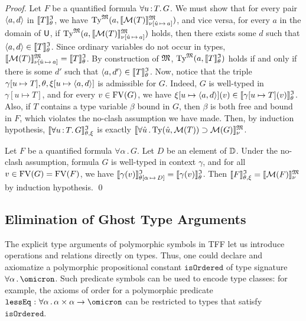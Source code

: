 \begin{proof}
Let $F$ be a quantified formula $\forall u \operatorname{:} T .\, G$.
We must show that for every pair $\langle a,d \rangle$ in $\llbracket T\rrbracket^{\mathfrak{I}}_{\theta}$, we have
$\mathrm{Ty}^{\mathfrak{M}}(a, \llbracket \mathcal{M}(T) \rrbracket^{\mathfrak{M}}_{\nu[\hat{u}\,\mapsto\,a]})$,
and vice versa, for every $a$ in the domain of $\mathsf{U}$, if
$\mathrm{Ty}^{\mathfrak{M}}(a, \llbracket \mathcal{M}(T) \rrbracket^{\mathfrak{M}}_{\nu[\hat{u}\,\mapsto\,a]})$
holds, then there exists some $d$ such that $\langle a,d \rangle \in
\llbracket T\rrbracket^{\mathfrak{I}}_{\theta}$.
%
Since ordinary variables do not occur in types,
$\llbracket \mathcal{M}(T) \rrbracket^{\mathfrak{M}}_{\nu[\hat{u}\,\mapsto\,a]} =
\llbracket T \rrbracket^{\mathfrak{I}}_\theta$.
By construction of $\mathfrak{M}$,
$\mathrm{Ty}^{\mathfrak{M}}(a, \llbracket T \rrbracket^{\mathfrak{I}}_\theta)$
holds if and only if there is some $d'$ such that
$\langle a,d' \rangle \in \llbracket T \rrbracket^{\mathfrak{I}}_\theta$.
%
Now, notice that the triple $\gamma[u \mapsto T],
\theta,\xi[u \mapsto \langle a,d \rangle]$ is admissible for $G$.
Indeed, $G$ is well-typed in $\gamma[u \mapsto T]$,
and for every $v \in \mathrm{FV}(G)$, we have
$\xi[u \mapsto \langle a,d \rangle](v) \in \llbracket\gamma[u \mapsto T](v)\rrbracket^{\mathfrak{I}}_{\theta}$.
Also, if $T$ contains a type variable $\beta$ bound in $G$,
then $\beta$ is both free and bound in $F$, which violates
the no-clash assumption we have made.
%
Then, by induction hypothesis, $\llbracket\forall u \operatorname{:} T .\, G\rrbracket^{\mathfrak{I}}_{\theta,\xi}$
is exactly $\llbracket \forall \hat{u} \,.\, \mathrm{Ty}(\hat{u},\mathcal{M}(T))
\supset \mathcal{M}(G) \rrbracket^{\mathfrak{M}}_{\nu}$.

Let $F$ be a quantified formula $\forall \alpha \,.\, G$.
Let $D$ be an element of $\mathbb{D}$. Under the no-clash assumption,
formula $G$ is well-typed in context $\gamma$, and for all
$v \in \mathrm{FV}(G) = \mathrm{FV}(F)$, we have
$\llbracket\gamma(v)\rrbracket^{\mathfrak{I}}_{\theta[\alpha\,\mapsto\,D]} = \llbracket\gamma(v)\rrbracket^{\mathfrak{I}}_{\theta}$.
Then $\llbracket F\rrbracket^{\mathfrak{I}}_{\theta,\xi} = \llbracket \mathcal{M}(F) \rrbracket^{\mathfrak{M}}_{\nu}$ by induction hypothesis.
\qed
\end{proof}

\subsection{Elimination of Ghost Type Arguments} \label{ssec:ghost}
The explicit type arguments of polymorphic symbols
in TFF let us introduce operations and relations directly on types.
Thus, one could declare and axiomatize a polymorphic propositional
constant $\mathtt{isOrdered}$ of type signature $\forall\alpha\,.\,\omicron$.
Such predicate symbols can be used to encode type classes:
for example, the axioms of order for a polymorphic predicate
$\mathtt{lessEq} \,\ty\, \forall\alpha\,.\,\alpha\times\alpha\to\omicron$
can be restricted to types that satisfy $\mathtt{isOrdered}$.

